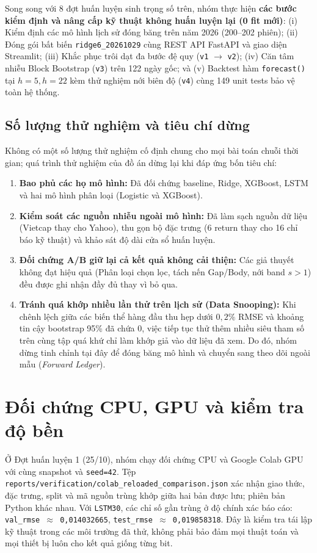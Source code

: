 \documentclass[12pt,a4paper]{report}
\begin{document}
Song song với 8 đợt huấn luyện sinh trọng số trên, nhóm thực hiện \textbf{các bước kiểm định và nâng cấp kỹ thuật không huấn luyện lại (0 fit mới)}: (i) Kiểm định các mô hình lịch sử đóng băng trên năm 2026 (200--202 phiên); (ii) Đóng gói bất biến \nolinkurl{ridge6_20261029} cùng REST API FastAPI và giao diện Streamlit; (iii) Khắc phục trôi dạt đa bước đệ quy (\texttt{v1} $\to$ \texttt{v2}); (iv) Căn tâm nhiễu Block Bootstrap (\texttt{v3}) trên 122 ngày gốc; và (v) Backtest hàm \texttt{forecast()} tại $h=5, h=22$ kèm thử nghiệm nới biên độ (\texttt{v4}) cùng 149 unit tests bảo vệ toàn hệ thống.

\subsection{Số lượng thử nghiệm và tiêu chí dừng}
Không có một số lượng thử nghiệm cố định chung cho mọi bài toán chuỗi thời gian; quá trình thử nghiệm của đồ án dừng lại khi đáp ứng bốn tiêu chí:
\begin{enumerate}
    \item \textbf{Bao phủ các họ mô hình:} Đã đối chứng baseline, Ridge, XGBoost, LSTM và hai mô hình phân loại (Logistic và XGBoost).
    \item \textbf{Kiểm soát các nguồn nhiễu ngoài mô hình:} Đã làm sạch nguồn dữ liệu (Vietcap thay cho Yahoo), thu gọn bộ đặc trưng (6 return thay cho 16 chỉ báo kỹ thuật) và khảo sát độ dài cửa sổ huấn luyện.
    \item \textbf{Đối chứng A/B giữ lại cả kết quả không cải thiện:} Các giả thuyết không đạt hiệu quả (Phân loại chọn lọc, tách nến Gap/Body, nới band $s>1$) đều được ghi nhận đầy đủ thay vì bỏ qua.
    \item \textbf{Tránh quá khớp nhiều lần thử trên lịch sử (Data Snooping):} Khi chênh lệch giữa các biến thể hàng đầu thu hẹp dưới $0,2\%$ RMSE và khoảng tin cậy bootstrap 95\% đã chứa 0, việc tiếp tục thử thêm nhiều siêu tham số trên cùng tập quá khứ chỉ làm khớp giả vào dữ liệu đã xem. Do đó, nhóm dừng tinh chỉnh tại đây để đóng băng mô hình và chuyển sang theo dõi ngoài mẫu (\textit{Forward Ledger}).
\end{enumerate}

\section{Đối chứng CPU, GPU và kiểm tra độ bền}
Ở Đợt huấn luyện 1 (25/10), nhóm chạy đối chứng CPU và Google Colab GPU với cùng snapshot và \texttt{seed=42}. Tệp \nolinkurl{reports/verification/colab_reloaded_comparison.json} xác nhận giao thức, đặc trưng, split và mã nguồn trùng khớp giữa hai bản được lưu; phiên bản Python khác nhau. Với \texttt{LSTM30}, các chỉ số gần trùng ở độ chính xác báo cáo: \texttt{val\_rmse $\approx$ 0,014032665}, \texttt{test\_rmse $\approx$ 0,019858318}. Đây là kiểm tra tái lập kỹ thuật trong các môi trường đã thử, không phải bảo đảm mọi thuật toán và mọi thiết bị luôn cho kết quả giống từng bit.
\end{document}
